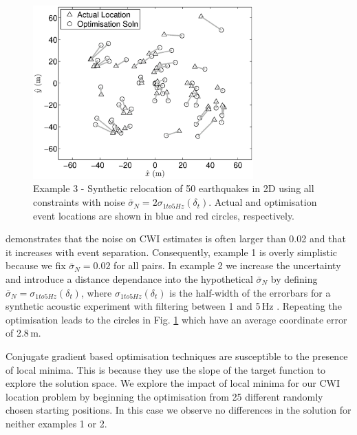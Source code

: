 \documentclass[extra]{gji}
\begin{document}
\begin{figure}
\includegraphics[width = 20pc]{diags/locs_2D_50eq_3.eps}
\caption{Example 3 - Synthetic relocation of 50 earthquakes in 2D using all constraints with noise
$\bar{\sigma}_N= 2 \sigma_{1to5Hz}(\delta_t)$.
 Actual and optimisation event locations
are shown in blue and red circles, respectively.}
\label{fig-2D50eq-relocation_eg3}
\end{figure}
\citet{dr_Robinson10b} demonstrates that the noise on CWI estimates is often larger than 0.02 and that it increases
with event separation. Consequently, example 1 is overly simplistic because we fix
$\bar{\sigma}_N=0.02$ for all pairs. In example 2 we increase the uncertainty and introduce a distance
dependance into the hypothetical $\bar{\sigma}_N$ by defining
$\bar{\sigma}_N=\sigma_{1to5Hz}(\delta_t)$, where $\sigma_{1to5Hz}(\delta_t)$ is the half-width of
the errorbars for a synthetic acoustic experiment
with filtering between 1 and 5\,Hz \citep[see Fig4(b) of ][]{dr_Robinson10b}.
Repeating the optimisation leads
to the circles in Fig. \ref{fig-2D50eq-relocation_eg3} which have an average coordinate error of 2.8\,m.

Conjugate gradient based optimisation techniques are susceptible to the presence of local minima.
This is because they use the slope of the target function to explore the solution space.
We explore the impact of local minima for our CWI location problem by beginning
the optimisation from 25 different randomly chosen starting positions. In this case we observe no differences
in the solution for neither examples 1 or 2.
\end{document}

